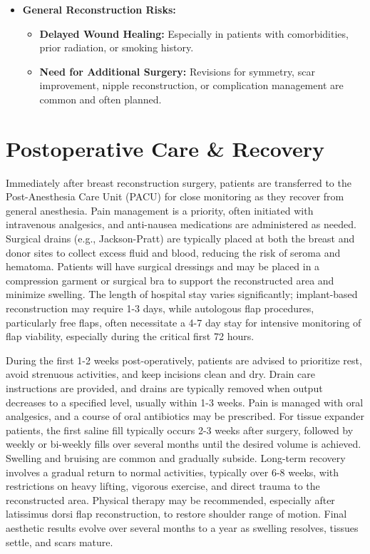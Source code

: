 \begin{itemize}
\begin{itemize}
      \item \textbf{Asymmetry:} Difficulty achieving perfect symmetry with the contralateral breast, potentially requiring revision surgery.
      \item \textbf{Altered Sensation:} Numbness or altered sensation in the reconstructed breast and/or donor site due to nerve transection.
    \end{itemize}
  \item \textbf{General Reconstruction Risks:}
    \begin{itemize}
      \item \textbf{Delayed Wound Healing:} Especially in patients with comorbidities, prior radiation, or smoking history.
      \item \textbf{Need for Additional Surgery:} Revisions for symmetry, scar improvement, nipple reconstruction, or complication management are common and often planned.
    \end{itemize}
\end{itemize}

\section*{Postoperative Care \& Recovery}
Immediately after breast reconstruction surgery, patients are transferred to the Post-Anesthesia Care Unit (PACU) for close monitoring as they recover from general anesthesia. Pain management is a priority, often initiated with intravenous analgesics, and anti-nausea medications are administered as needed. Surgical drains (e.g., Jackson-Pratt) are typically placed at both the breast and donor sites to collect excess fluid and blood, reducing the risk of seroma and hematoma. Patients will have surgical dressings and may be placed in a compression garment or surgical bra to support the reconstructed area and minimize swelling. The length of hospital stay varies significantly; implant-based reconstruction may require 1-3 days, while autologous flap procedures, particularly free flaps, often necessitate a 4-7 day stay for intensive monitoring of flap viability, especially during the critical first 72 hours.

During the first 1-2 weeks post-operatively, patients are advised to prioritize rest, avoid strenuous activities, and keep incisions clean and dry. Drain care instructions are provided, and drains are typically removed when output decreases to a specified level, usually within 1-3 weeks. Pain is managed with oral analgesics, and a course of oral antibiotics may be prescribed. For tissue expander patients, the first saline fill typically occurs 2-3 weeks after surgery, followed by weekly or bi-weekly fills over several months until the desired volume is achieved. Swelling and bruising are common and gradually subside. Long-term recovery involves a gradual return to normal activities, typically over 6-8 weeks, with restrictions on heavy lifting, vigorous exercise, and direct trauma to the reconstructed area. Physical therapy may be recommended, especially after latissimus dorsi flap reconstruction, to restore shoulder range of motion. Final aesthetic results evolve over several months to a year as swelling resolves, tissues settle, and scars mature.

